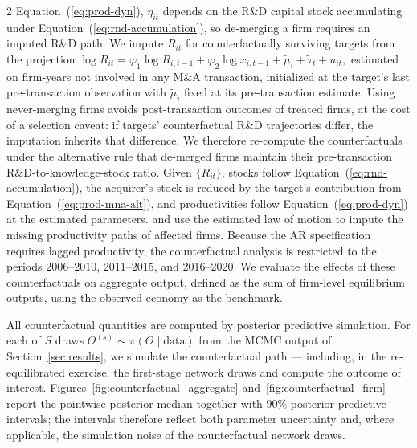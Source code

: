 \documentclass[12pt]{article}
\begin{document}
\begin{spacing}{2}
{Equation~(\ref{eq:prod-dyn}), $\eta_{it}$ depends on the R\&D capital stock
accumulating under Equation~(\ref{eq:rnd-accumulation}), so de-merging a firm
requires an imputed R\&D path. We impute $R_{it}$ for counterfactually
surviving targets from the projection
$
  \log R_{it}
  =
  \varphi_1 \log R_{i,t-1}
  + \varphi_2 \log x_{i,t-1}
  + \tilde\mu_i + \tilde\tau_t + u_{it},
$ 
estimated on firm-years not involved in any M\&A transaction, initialized at
the target's last pre-transaction observation with $\tilde\mu_i$ fixed at its
pre-transaction estimate. Using never-merging firms avoids post-transaction
outcomes of treated firms, at the cost of a selection caveat: if targets'
counterfactual R\&D trajectories differ, the imputation inherits that
difference. We therefore re-compute the counterfactuals under the alternative
rule that de-merged firms maintain their pre-transaction R\&D-to-knowledge-stock
ratio. Given $\{R_{it}\}$, stocks follow
Equation~(\ref{eq:rnd-accumulation}), the acquirer's stock is reduced by the
target's contribution from Equation~(\ref{eq:prod-mna-alt}), and productivities
follow Equation~(\ref{eq:prod-dyn}) at the estimated parameters.} and use the estimated law of motion to impute the missing productivity paths of affected firms. Because the AR specification requires lagged productivity, the counterfactual analysis is restricted to the periods 2006--2010, 2011--2015, and 2016--2020. We evaluate the effects of these counterfactuals on aggregate output, defined as the sum of firm-level equilibrium outputs, using the observed economy as the benchmark.

All counterfactual quantities are computed by posterior predictive
simulation. For each of $S$ draws
$\Theta^{(s)} \sim \pi(\Theta \mid \mathrm{data})$ from the MCMC output
of Section~\ref{sec:results}, we simulate the counterfactual path ---
including, in the re-equilibrated exercise, the first-stage network
draws and compute the outcome of interest. Figures~\ref{fig:counterfactual_aggregate}
and~\ref{fig:counterfactual_firm} report the pointwise posterior median together with $90\%$ posterior
predictive intervals; the intervals therefore reflect both parameter
uncertainty and, where applicable, the simulation noise of the
counterfactual network draws.


\end{spacing}
\end{document}
